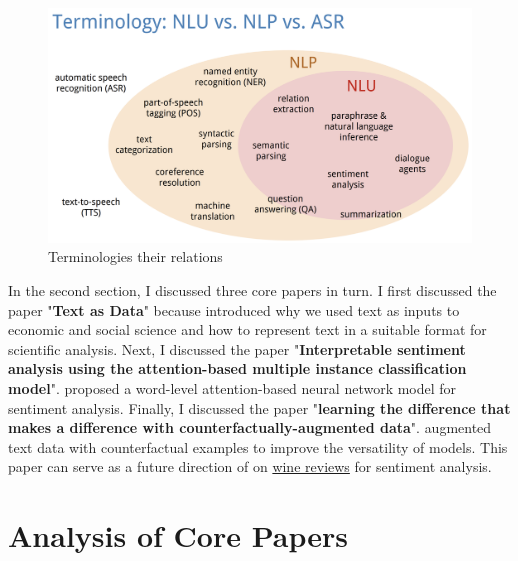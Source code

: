 \documentclass[aoas]{imsart}
\numberwithin{equation}{section}
\theoremstyle{plain}
\theoremstyle{remark}
\begin{document}
\begin{figure}[ht]
\includegraphics[scale=0.3]{img/f1.png}
\caption{Terminologies their relations}
\label{Fig1: term}
\end{figure}

In the second section, I discussed three core papers in turn. I first discussed the paper "\textbf{Text as Data}" because \cite{10.1257/jel.20181020} introduced why we used text as inputs to economic and social science and how to represent text in a suitable format for scientific analysis. Next, I discussed the paper "\textbf{Interpretable sentiment analysis using the attention-based multiple instance classification model}". \cite{chenyu} proposed a word-level attention-based neural network model for sentiment analysis. Finally, I discussed the paper "\textbf{learning the difference that makes a difference with counterfactually-augmented data}". \cite{DBLP:journals/corr/abs-1909-12434} augmented text data with counterfactual examples to improve the versatility of models. This paper \cite{DBLP:journals/corr/abs-1909-12434} can serve as a future direction of \cite{chenyu} on \href{https://www.winespectator.com/}{wine reviews} for sentiment analysis. 


\section{Analysis of Core Papers}
\end{document}

